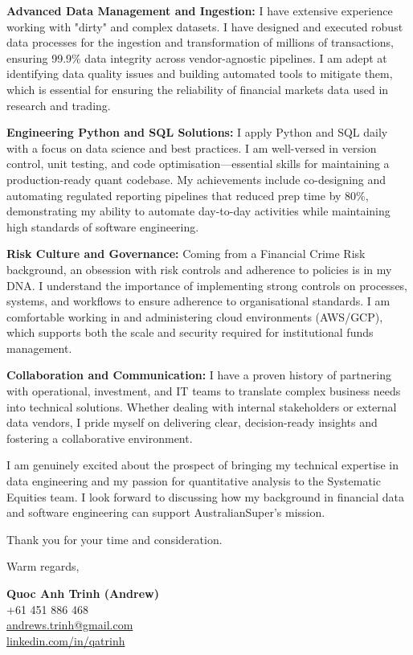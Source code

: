 \documentclass[11pt, a4paper]{article}
\begin{document}
\textbf{Advanced Data Management and Ingestion:}
I have extensive experience working with "dirty" and complex datasets. I have designed and executed robust data processes for the ingestion and transformation of millions of transactions, ensuring 99.9\% data integrity across vendor-agnostic pipelines. I am adept at identifying data quality issues and building automated tools to mitigate them, which is essential for ensuring the reliability of financial markets data used in research and trading.

\textbf{Engineering Python and SQL Solutions:}
I apply Python and SQL daily with a focus on data science and best practices. I am well-versed in version control, unit testing, and code optimisation—essential skills for maintaining a production-ready quant codebase. My achievements include co-designing and automating regulated reporting pipelines that reduced prep time by 80\%, demonstrating my ability to automate day-to-day activities while maintaining high standards of software engineering.

\textbf{Risk Culture and Governance:}
Coming from a Financial Crime Risk background, an obsession with risk controls and adherence to policies is in my DNA. I understand the importance of implementing strong controls on processes, systems, and workflows to ensure adherence to organisational standards. I am comfortable working in and administering cloud environments (AWS/GCP), which supports both the scale and security required for institutional funds management.

\textbf{Collaboration and Communication:}
I have a proven history of partnering with operational, investment, and IT teams to translate complex business needs into technical solutions. Whether dealing with internal stakeholders or external data vendors, I pride myself on delivering clear, decision-ready insights and fostering a collaborative environment.

I am genuinely excited about the prospect of bringing my technical expertise in data engineering and my passion for quantitative analysis to the Systematic Equities team. I look forward to discussing how my background in financial data and software engineering can support AustralianSuper’s mission.

Thank you for your time and consideration.

\vspace{20pt}

Warm regards,

\vspace{30pt}

\textbf{Quoc Anh Trinh (Andrew)}\\
+61 451 886 468\\
\href{mailto:andrews.trinh@gmail.com}{andrews.trinh@gmail.com}\\
\href{https://www.linkedin.com/in/qatrinh}{linkedin.com/in/qatrinh}
\end{document}
